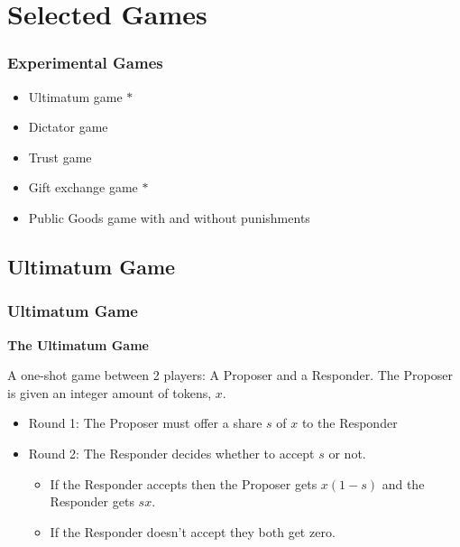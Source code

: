 \documentclass{beamer}
\begin{document}
\section{Selected Games}


\begin{frame}
	\frametitle{Experimental Games}
	\begin{itemize}
		\item Ultimatum game $\ast$ 
		\item Dictator game
		\item Trust game
		\item Gift exchange game $\ast$ 
		\item Public Goods game with and without punishments
	\end{itemize}
\end{frame}

\subsection{Ultimatum Game}


\begin{frame}
	\frametitle{Ultimatum Game}
	\textbf{The Ultimatum Game}
	
	A one-shot game between 2 players: A Proposer and a Responder. The Proposer is given an integer amount of tokens, $x$.
	
	\begin{itemize}
		\item Round 1: The Proposer must offer a share $s$ of $x$ to the Responder
		\item Round 2: The Responder decides whether to accept $s$ or not. 
		\begin{itemize}
			\item If the Responder accepts then the Proposer gets $x \left(1 - s\right)$ and the Responder gets $sx$.
			\item If the Responder doesn't accept they both get zero.
		\end{itemize}
	\end{itemize}
	
\end{frame}
\end{document}
